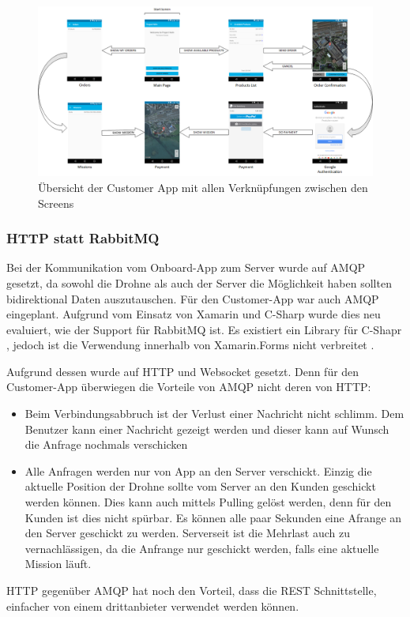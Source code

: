\begin{landscape}
	\begin{figure}[h]
		\centering
		\includegraphics[width=0.8\paperheight] {images/customer-app-pages.png}
		\caption{Übersicht der Customer App mit allen Verknüpfungen zwischen den Screens}
		\label{fig:customer-app-flow}
	\end{figure}
\end{landscape}


\subsubsection{HTTP statt RabbitMQ}
Bei der Kommunikation vom Onboard-App zum Server wurde auf AMQP gesetzt, da sowohl die Drohne als auch der Server die Möglichkeit haben sollten bidirektional Daten auszutauschen. 
Für den Customer-App war auch AMQP eingeplant. Aufgrund vom Einsatz von Xamarin und C-Sharp wurde dies neu evaluiert, wie der Support für RabbitMQ ist.
Es existiert ein Library für C-Shapr \cite{easynetq}, jedoch ist die Verwendung innerhalb von Xamarin.Forms nicht verbreitet \cite{amqp-csharp}. 

Aufgrund dessen wurde auf HTTP und Websocket gesetzt.
Denn für den Customer-App überwiegen die Vorteile von AMQP nicht deren von HTTP:
\begin{itemize}
	\item{
	Beim Verbindungsabbruch ist der Verlust einer Nachricht nicht schlimm.
	Dem Benutzer kann einer Nachricht gezeigt werden und dieser kann auf Wunsch die Anfrage nochmals verschicken}
	\item{
	    Alle Anfragen werden nur von App an den Server verschickt.
	    Einzig die aktuelle Position der Drohne sollte vom Server an den Kunden geschickt werden können.
	    Dies kann auch mittels Pulling gelöst werden, denn für den Kunden ist dies nicht spürbar.
	    Es können alle paar Sekunden eine Afrange an den Server geschickt zu werden.
	    Serverseit ist die Mehrlast auch zu vernachlässigen, da die Anfrange nur geschickt werden,
	    falls eine aktuelle Mission läuft.
	}
\end{itemize}

HTTP gegenüber AMQP hat noch den Vorteil, dass die REST Schnittstelle, einfacher von einem drittanbieter verwendet werden können.

